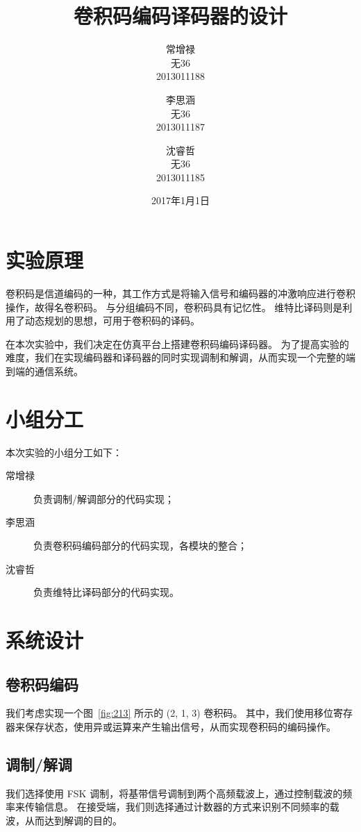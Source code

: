 \documentclass[UTF8]{ctexart}
\title{卷积码编码译码器的设计}
\author{常增禄 \\ 无36 \\ 2013011188 \and
        李思涵 \\ 无36 \\ 2013011187 \and
        沈睿哲 \\ 无36 \\ 2013011185}
\date{2017年1月1日}
\begin{document}
\maketitle

\section{实验原理}

卷积码是信道编码的一种，其工作方式是将输入信号和编码器的冲激响应进行卷积操作，故得名卷积码。
与分组编码不同，卷积码具有记忆性。
维特比译码则是利用了动态规划的思想，可用于卷积码的译码。

在本次实验中，我们决定在仿真平台上搭建卷积码编码译码器。
为了提高实验的难度，我们在实现编码器和译码器的同时实现调制和解调，从而实现一个完整的端到端的通信系统。

\section{小组分工}

本次实验的小组分工如下：

\begin{description}
    \item[常增禄] 负责调制/解调部分的代码实现；
    \item[李思涵] 负责卷积码编码部分的代码实现，各模块的整合；
    \item[沈睿哲] 负责维特比译码部分的代码实现。
\end{description}
\section{系统设计}

\subsection{卷积码编码}

我们考虑实现一个图~\ref{fig:213} 所示的 (2, 1, 3) 卷积码。
其中，我们使用移位寄存器来保存状态，使用异或运算来产生输出信号，从而实现卷积码的编码操作。

\subsection{调制/解调}

我们选择使用 FSK 调制，将基带信号调制到两个高频载波上，通过控制载波的频率来传输信息。
在接受端，我们则选择通过计数器的方式来识别不同频率的载波，从而达到解调的目的。
\end{document}

